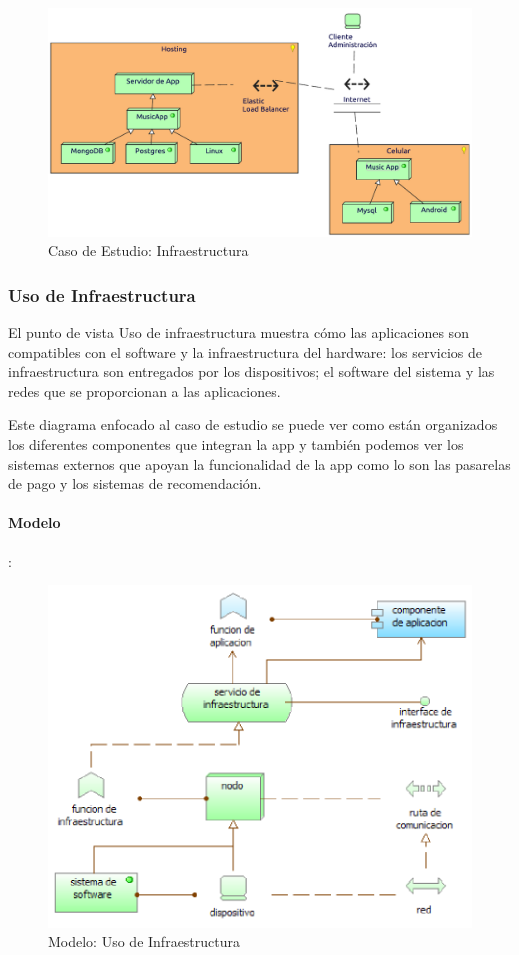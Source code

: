 \begin{figure}[h!]
	\centering
	\includegraphics[width=\linewidth]{Desarrollo/ArquitecturaEmpresarial/Tecnologia/imgs/insfraestructura.pdf}
	\caption{Caso de Estudio: Infraestructura}
\end{figure}

\newpage

\subsubsection{Uso de Infraestructura}
El punto de vista Uso de infraestructura muestra cómo las aplicaciones son compatibles con el software y la infraestructura del hardware: los servicios de infraestructura son entregados por los dispositivos; el software del sistema y las redes que se proporcionan a las aplicaciones.  \vspace{\baselineskip}

Este diagrama enfocado al caso de estudio se puede ver como están organizados los diferentes componentes que integran la app y también podemos ver los sistemas externos que apoyan la funcionalidad de la app como lo son las pasarelas de pago y los sistemas de recomendación.
\paragraph{Modelo}:
\begin{figure}[h!]
	\centering
	\includegraphics[width=0.8\linewidth]{Desarrollo/ArquitecturaEmpresarial/Tecnologia/imgs/uso.PNG}
	\caption{Modelo: Uso de Infraestructura}
\end{figure}
\newpage
